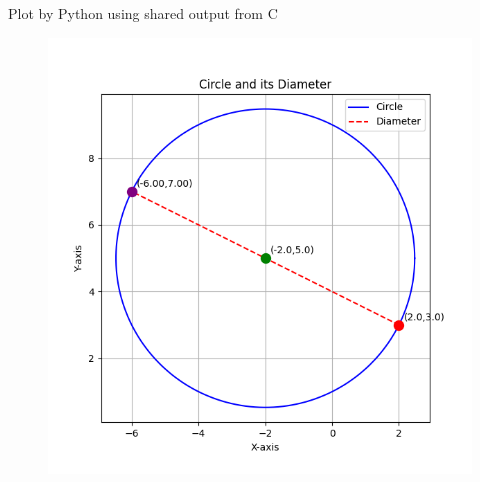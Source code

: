 \documentclass{beamer}
\begin{document}
\begin{frame}{Plot by Python using shared output from C}
\begin{figure}[H]
        \centering
        \includegraphics[width=0.7\columnwidth]{../figs/fig2.png}
        \caption{}
        \label{fig:2}
    \end{figure}
\end{frame}
 
\end{document}
